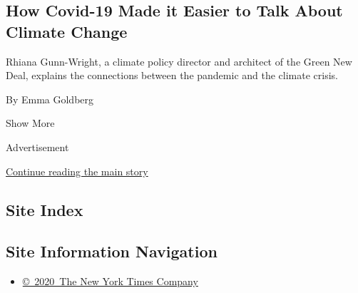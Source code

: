 \begin{enumerate}
  \hypertarget{how-covid-19-made-it-easier-to-talk-about-climate-change}{%
  \subsection{How Covid-19 Made it Easier to Talk About Climate
  Change}\label{how-covid-19-made-it-easier-to-talk-about-climate-change}}

  Rhiana Gunn-Wright, a climate policy director and architect of the
  Green New Deal, explains the connections between the pandemic and the
  climate crisis.

  By Emma Goldberg
\end{enumerate}

Show More

Advertisement

\protect\hyperlink{after-mid2}{Continue reading the main story}

\hypertarget{site-index}{%
\subsection{Site Index}\label{site-index}}

\hypertarget{site-information-navigation}{%
\subsection{Site Information
Navigation}\label{site-information-navigation}}

\begin{itemize}
\tightlist
\item
  \href{https://help.nytimes3xbfgragh.onion/hc/en-us/articles/115014792127-Copyright-notice}{©~2020~The
  New York Times Company}
\end{itemize}

